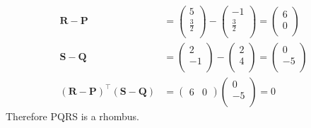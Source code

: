 \documentclass[12pt]{article}
\providecommand{\brak}[1]{\ensuremath{\left(#1\right)}}
\newcommand{\myvec}[1]{\ensuremath{\begin{pmatrix}#1\end{pmatrix}}}
\let\vec\mathbf
\begin{document}
\begin{enumerate}
\begin{align}
\vec{R}-\vec{P} &=  \myvec{
 5 \\
 \frac{3}{2} \\
 } - \myvec{
 -1 \\
 \frac{3}{2} \\
 } = \myvec{
 6 \\
 0 \\ 
 } \\
 \vec{S}-\vec{Q} &=  \myvec{
 2 \\
 -1 \\
 } - \myvec{
 2 \\
 4 \\
 } = \myvec{
 0 \\
 -5 \\ 
 } \\ 
 \brak{\vec{R}-\vec{P}}^\top\brak{\vec{S}-\vec{Q}} &= \myvec{
 6 & 0} \myvec{
 0 \\
 -5 \\
 } = 0
\end{align}
Therefore PQRS is a rhombus.

\end{enumerate}
\end{document}
